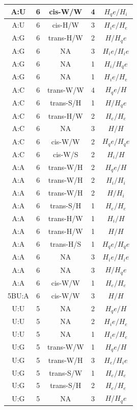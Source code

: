 \begin{center}
\begin{longtable}{c|c|c|c|c}
A:U & 6 & cis-W/W & 4 & $H_qe/H_i$ \\  \hline
A:U & 6 & cis-H/W & 3 & $H_ie/H_e$ \\  \hline
A:G & 6 & trans-H/W & 2 & $H/H_qe$ \\  \hline
A:G & 6 & NA & 3 & $H_ie/H_ie$ \\  \hline
A:G & 6 & NA & 1 & $H_i/H_qe$ \\  \hline
A:G & 6 & NA & 1 & $H_ie/H_e$ \\  \hline
A:C & 6 & trans-W/W & 4 & $H_qe/H$ \\  \hline
A:C & 6 & trans-S/H & 1 & $H/H_qe$ \\  \hline
A:C & 6 & trans-H/W & 2 & $H_e/H_e$ \\  \hline
A:C & 6 & NA & 3 & $H/H$ \\  \hline
A:C & 6 & cis-W/W & 2 & $H_qe/H_qe$ \\  \hline
A:C & 6 & cis-W/S & 2 & $H_i/H$ \\  \hline
A:A & 6 & trans-W/H & 2 & $H_qe/H$ \\  \hline
A:A & 6 & trans-W/H & 2 & $H_i/H_i$ \\  \hline
A:A & 6 & trans-W/H & 2 & $H/H_i$ \\  \hline
A:A & 6 & trans-S/H & 1 & $H_e/H_e$ \\  \hline
A:A & 6 & trans-H/W & 1 & $H_i/H$ \\  \hline
A:A & 6 & trans-H/W & 1 & $H/H$ \\  \hline
A:A & 6 & trans-H/S & 1 & $H_qe/H_qe$ \\  \hline
A:A & 6 & NA & 3 & $H_ie/H_ie$ \\  \hline
A:A & 6 & NA & 3 & $H/H_qe$ \\  \hline
A:A & 6 & cis-W/W & 1 & $H_e/H_e$ \\  \hline
5BU:A & 6 & cis-W/W & 3 & $H/H$ \\  \hline
U:U & 5 & NA & 2 & $H_qe/H$ \\  \hline
U:U & 5 & NA & 2 & $H_ie/H_e$ \\  \hline
U:U & 5 & NA & 1 & $H_ie/H_e$ \\  \hline
U:G & 5 & trans-W/W & 1 & $H_qe/H$ \\  \hline
U:G & 5 & trans-W/H & 3 & $H_e/H_ie$ \\  \hline
U:G & 5 & trans-S/W & 1 & $H_e/H_e$ \\  \hline
U:G & 5 & trans-S/H & 2 & $H_e/H_e$ \\  \hline
U:G & 5 & NA & 3 & $H/H_qe$ \\  \hline

\end{longtable}
\end{center}

